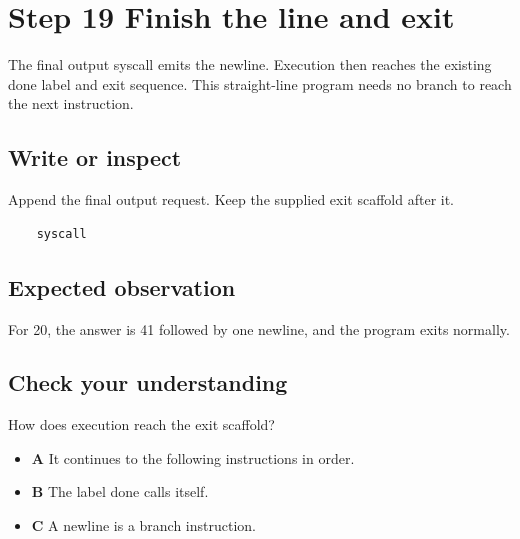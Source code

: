 \section{Step 19 Finish the line and
  exit}\label{001-console-calculation-s19-step-19-finish-the-line-and-exit}

The final output syscall emits the newline. Execution then reaches the
existing done label and exit sequence. This straight-line program needs
no branch to reach the next instruction.

\subsection{Write or
  inspect}\label{001-console-calculation-s19-write-or-inspect}

Append the final output request. Keep the supplied exit scaffold after
it.

\begin{verbatim}
    syscall
\end{verbatim}

\subsection{Expected
  observation}\label{001-console-calculation-s19-expected-observation}

For 20, the answer is 41 followed by one newline, and the program exits
normally.

\subsection{Check your
  understanding}\label{001-console-calculation-s19-check-your-understanding}

How does execution reach the exit scaffold?

\begin{itemize}
  \tightlist
  \item
        \textbf{A} It continues to the following instructions in order.
  \item
        \textbf{B} The label done calls itself.
  \item
        \textbf{C} A newline is a branch instruction.
\end{itemize}
